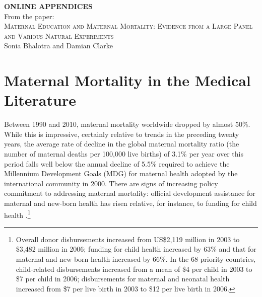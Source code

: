 \documentclass{article}
\begin{document}
\begin{spacing}{1.4}

\begin{center}
\textbf{ONLINE APPENDICES} \\
\vspace{4mm}
From the paper: \\
\vspace{6mm}
       {\large \textsc{Maternal Education and Maternal Mortality:
       Evidence from a Large Panel and Various Natural Experiments}} \\
Sonia Bhalotra and Damian Clarke
\end{center}

\tableofcontents


\setlength\parindent{0.25in}
\setlength\parskip{0.25in}


\newpage
\section{Maternal Mortality in the Medical Literature}
\label{scn:medliterature}
Between 1990 and 2010, maternal mortality worldwide dropped by almost 50\%. 
While this is impressive, certainly relative to trends in the preceding twenty 
years, the average rate of decline in the global maternal mortality ratio (the 
number of maternal deaths per 100,000 live births) of 3.1\% per year over this 
period falls well below the annual decline of 5.5\% required to achieve the 
Millennium Development Goals (MDG) for maternal health adopted by the 
international community in 2000. There are signs of increasing policy commitment 
to addressing maternal mortality: official development assistance for maternal 
and new-born health has risen relative, for instance, to funding for child 
health \citep{Grecoetal2008}.\footnote{Overall donor disbursements increased from 
US\$2,119 million in 2003 to \$3,482 million in 2006; funding for child
health increased by 63\% and that for maternal and new-born health increased by 
66\%. In the 68 priority countries, child-related disbursements increased from a 
mean of \$4 per child in 2003 to \$7 per child in 2006; disbursements for 
maternal and neonatal health increased from \$7 per live birth in 2003 to \$12 
per live birth in 2006.}


\end{spacing}
\end{document}
